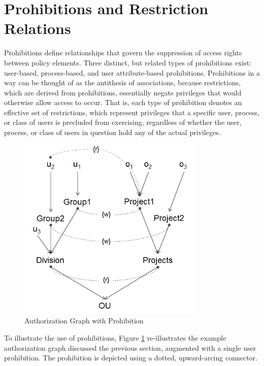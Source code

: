 \documentclass[12pt,a4paper,titlepage]{book}
\begin{document}
	\section{Prohibitions and Restriction Relations}

	Prohibitions define relationships that govern the suppression of access rights between policy
	elements. Three distinct, but related types of prohibitions exist: user-based, process-based, and user attribute-based prohibitions. Prohibitions in a way can be thought of as the antithesis of associations, because restrictions, which are derived from prohibitions, essentially negate privileges that would otherwise allow access to occur. That is, each type of prohibition denotes an effective set of restrictions, which represent privileges that a specific user, process, or class of users is precluded from exercising, regardless of whether the user, process, or class of users in question hold any of the actual privileges.
	
	\begin{figure}[h]
		\centering
		\includegraphics[width = 0.8\textwidth]{images/Authorization_Graph_with_Prohibition.png}
		\caption{Authorization Graph with Prohibition}
		\label{fig:AuthorizationGraphWithProhibition}
	\end{figure}

	To illustrate the use of prohibitions, Figure \ref{fig:AuthorizationGraphWithProhibition} re-illustrates the example authorization graph discussed the previous section, augmented with a single user prohibition. The prohibition is depicted using a dotted, upward-arcing connector.
	
\end{document}
